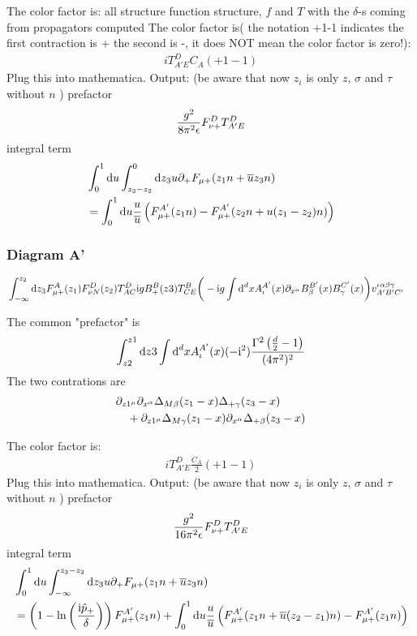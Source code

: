 The color factor is: all structure function structure, $f$ and $T$ with the $\delta$-s coming from propagators computed
The color factor is( the notation +1-1 indicates the first contraction is + the second is -, it does NOT mean the color factor is zero!):
\begin{align}
	i T^{D}_{A'E}C_A(+1-1)
\end{align}
Plug this into mathematica.
Output: (be aware that now $z_i$ is only $z$, $\sigma$ and $\tau$ without $n$ )
prefactor
\begin{align}
	\frac{g^2}{8 \pi^2 \epsilon} F_{\nu +}^D T^D_{A'E}
\end{align}
integral term
\begin{align}
	&\int_0^1 \text{d} u \int_{z_3 -z_2}^{0} \text{d} z_3 u \partial_+ F_{\mu +}(z_1 n + \overline u z_3 n)
	\\
	&=\int_0^1 \text{d} u \frac{u}{\overline u} \left(F_{\mu +}^{A'}(z_1 n) -F_{\mu +}^{A'}(z_2n + u(z_1-z_2) n) \right)
\end{align}

\subsubsection{Diagram A'}
\begin{align}
&\int_{-\infty}^{z_2}\text{d} z_3F_{\mu +}^{A}(z_1)F _{\nu N}^D(z_2) T^D_{AC}\text{i} g B_+^B(z3)  T^B_{CE}\bigg(-\text{i} g \int \text{d} ^d xA_\iota^{A'}(x) \partial_{x^\alpha} B_\beta^{B'} (x) B_\gamma^{C'}(x) \bigg) v^{\iota \alpha\beta\gamma}_{A'B'C'}
\end{align}

The common "prefactor" is
\begin{align}
\int_{z2}^{z1} \text{d} z3 \int \text{d} ^d x A_\iota^{A'}(x) (- \text{i} ^2) \frac{\Gamma^2\left(\frac{d}{2}-1\right)}{(4\pi^2)^2}
\end{align}
The two contrations are
\begin{align}
&\partial_{z1^{\mu}}\partial_{x^{\alpha}}\Delta_{M\beta}(z_1 -x )\Delta_{+\gamma}(z_3 -x )
\\&~~~
+\partial_{z1^{\mu}}\Delta_{M\gamma}(z_1 -x )\partial_{x^{\alpha}}\Delta_{+\beta}(z_3 -x )
\end{align}

The color factor is:
\begin{align}
i T^{D}_{A'E}\frac{C_A}{2}(+1-1)
\end{align}
Plug this into mathematica.
Output: (be aware that now $z_i$ is only $z$, $\sigma$ and $\tau$ without $n$ )
prefactor
\begin{align}
\frac{g^2}{16 \pi^2 \epsilon} F_{\nu +}^D T^D_{A'E}
\end{align}
integral term
\begin{align}
&\int_0^1 \text{d} u \int_{-\infty}^{z_3 -z_2} \text{d} z_3 u \partial_+ F_{\mu +}(z_1 n + \overline u z_3 n)
\\
&=\left(1- \ln\left(\frac{\text{i} \hat p_{+}}{\delta}\right)\right)F_{\mu +}^{A'}(z_1n)+\int_0^1 \text{d} u \frac{u}{\overline u} \left(F_{\mu +}^{A'}(z_1 n+\overline u (z_2-z_1)n) -F_{\mu +}^{A'}(z_1 n) \right)
\end{align}

